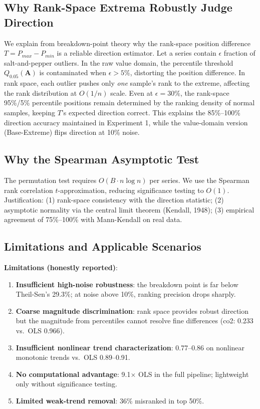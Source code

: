 \documentclass[11pt]{article}
\begin{document}
\subsection{Why Rank-Space Extrema Robustly Judge Direction}
We explain from breakdown-point theory why the rank-space position difference $T = P_{max} - P_{min}$ is a reliable direction estimator. Let a series contain $\epsilon$ fraction of salt-and-pepper outliers. In the raw value domain, the percentile threshold $Q_{0.05}(\mathbf{A})$ is contaminated when $\epsilon > 5\%$, distorting the position difference. In rank space, each outlier pushes only \emph{one} sample's rank to the extreme, affecting the rank distribution at $O(1/n)$ scale. Even at $\epsilon = 30\%$, the rank-space 95\%/5\% percentile positions remain determined by the ranking density of normal samples, keeping $T$'s expected direction correct. This explains the 85\%--100\% direction accuracy maintained in Experiment 1, while the value-domain version (Base-Extreme) flips direction at 10\% noise.

\subsection{Why the Spearman Asymptotic Test}
The permutation test requires $O(B \cdot n \log n)$ per series. We use the Spearman rank correlation $t$-approximation, reducing significance testing to $O(1)$. Justification: (1) rank-space consistency with the direction statistic; (2) asymptotic normality via the central limit theorem (Kendall, 1948); (3) empirical agreement of 75\%--100\% with Mann-Kendall on real data.

\subsection{Limitations and Applicable Scenarios}
\textbf{Limitations (honestly reported)}:
\begin{enumerate}
\item \textbf{Insufficient high-noise robustness}: the breakdown point is far below Theil-Sen's 29.3\%; at noise above 10\%, ranking precision drops sharply.
\item \textbf{Coarse magnitude discrimination}: rank space provides robust direction but the magnitude from percentiles cannot resolve fine differences (co2: 0.233 vs.\ OLS 0.966).
\item \textbf{Insufficient nonlinear trend characterization}: 0.77--0.86 on nonlinear monotonic trends vs.\ OLS 0.89--0.91.
\item \textbf{No computational advantage}: 9.1$\times$ OLS in the full pipeline; lightweight only without significance testing.
\item \textbf{Limited weak-trend removal}: 36\% misranked in top 50\%.
\end{enumerate}
\end{document}
